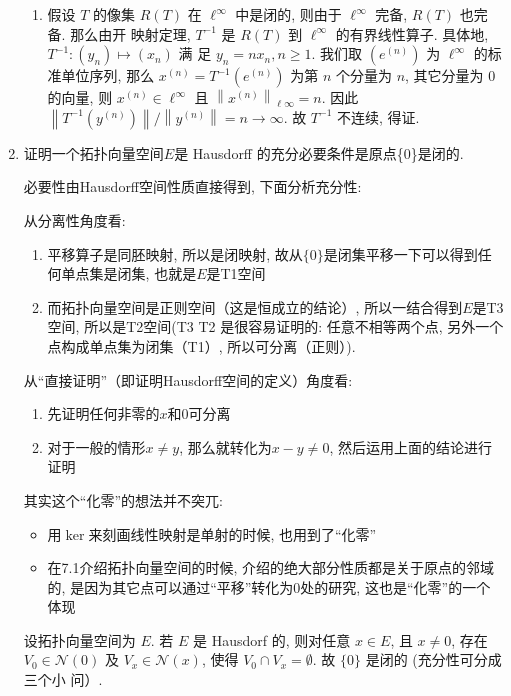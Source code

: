 \begin{enumerate}
\begin{answer}
\begin{enumerate}
            \item 假设 $T$ 的像集 $R(T)$ 在 $\ell^{\infty}$ 中是闭的, 则由于 $\ell^{\infty}$ 完备, $R(T)$ 也完备. 那么由开 映射定理, $T^{-1}$ 是 $R(T)$ 到 $\ell^{\infty}$ 的有界线性算子. 具体地, $T^{-1}:\left(y_{n}\right) \mapsto\left(x_{n}\right)$ 满 足 $y_{n}=n x_{n}, n \geq 1$. 我们取 $\left(e^{(n)}\right)$ 为 $\ell^{\infty}$ 的标准单位序列, 那么 $x^{(n)}=T^{-1}\left(e^{(n)}\right)$ 为第 $n$ 个分量为 $n$, 其它分量为 0 的向量, 则 $x^{(n)} \in \ell^{\infty}$ 且 $\left\|x^{(n)}\right\|_{\ell \infty}=n$. 因此 $\left\|T^{-1}\left(y^{(n)}\right)\right\| /\left\|y^{(n)}\right\|=n \rightarrow \infty$. 故 $T^{-1}$ 不连续, 得证.\qedhere
        \end{enumerate}
    \end{answer}
    \item\label{problem3-6} 证明一个拓扑向量空间$E$是 Hausdorff 的充分必要条件是原点\{0\}是闭的.
        \begin{exerciseanalysis}
                必要性由Hausdorff空间性质直接得到, 下面分析充分性:

                从分离性角度看: 
                \begin{enumerate}
                    \item 平移算子是同胚映射, 所以是闭映射, 故从$\{0\}$是闭集平移一下可以得到任何单点集是闭集, 也就是$E$是T1空间
                    \item 而拓扑向量空间是正则空间（这是恒成立的结论）, 所以一结合得到$E$是T3空间, 所以是T2空间(T3 \so T2 是很容易证明的: 任意不相等两个点, 另外一个点构成单点集为闭集（T1）, 所以可分离（正则）).
                \end{enumerate}

                从“直接证明”（即证明Hausdorff空间的定义）角度看:
                \begin{enumerate}
                    \item 先证明任何非零的$x$和0可分离
                    \item 对于一般的情形$x\neq  y$, 那么就转化为$x-y \neq  0$, 然后运用上面的结论进行证明
                \end{enumerate}

                其实这个“化零”的想法并不突兀: 
                \begin{itemize}
                    \item 用$\operatorname{ker}$来刻画线性映射是单射的时候, 也用到了“化零”
                    \item 在7.1介绍拓扑向量空间的时候, 介绍的绝大部分性质都是关于原点的邻域的, 是因为其它点可以通过“平移”转化为0处的研究, 这也是“化零”的一个体现
                \end{itemize}
        \end{exerciseanalysis}
        \begin{answer}[label=\ref{problem3-6}的证明（from 马涛老师给的参考答案）]
            设拓扑向量空间为 $E$. 若 $E$ 是 Hausdorf 的, 则对任意 $x \in E$, 且 $x \neq  0$, 存在 $V_{0} \in \mathcal{N}(0)$ 及 $V_{x} \in \mathcal{N}(x)$, 使得 $V_{0} \cap V_{x}=\emptyset$. 故 $\{0\}$ 是闭的 (充分性可分成三个小 问）.


\end{answer}
\end{enumerate}
